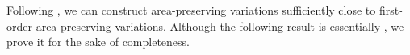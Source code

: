 \documentclass[11pt]{amsart}
\newcommand{\Om}{\Omega}
\newtheorem{lemma}[theorem]{Lemma}
\theoremstyle{definition}
\theoremstyle{remark}
\numberwithin{equation}{section}
\begin{document}
	Following \cite{MR731682}, we can construct area-preserving variations sufficiently close to first-order area-preserving variations. 
	Although the following result is essentially \cite[Lemma 2.1]{MR731682}, we prove it for the sake of completeness.
\end{document}
